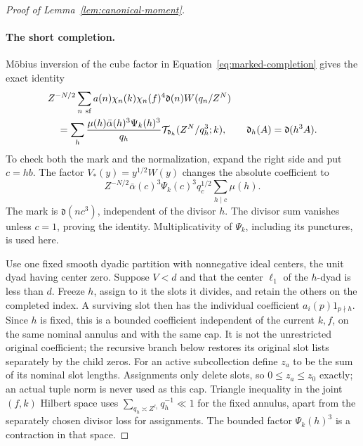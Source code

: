\documentclass[12pt]{article}
\begin{document}
\begin{proof}[Proof of Lemma~\ref{lem:canonical-moment}]
\paragraph{The short completion.}
M\"obius inversion of the cube factor in
Equation~\eqref{eq:marked-completion} gives the exact identity
\begin{equation}\label{eq:marked-completion-inversion}
 \begin{split}
 &Z^{-N/2}\sum_{n\ {\rm sf}}a(n)\chi_n(k)\chi_n(f)^4
       \mathfrak d(n)W(q_n/Z^N)\\
 &\quad=
 \sum_h\frac{\mu(h)\bar\alpha(h)^3\Psi_k(h)^3}{q_h}
       \mathcal T_{\mathfrak d_h}(Z^N/q_h^3;k),
 \qquad \mathfrak d_h(A)=\mathfrak d(h^3A).
 \end{split}
\end{equation}
To check both the mark and the normalization, expand the right side and
put \(c=hb\).  The factor \(V_*(y)=y^{1/2}W(y)\) changes the absolute
coefficient to
\[
 Z^{-N/2}\bar\alpha(c)^3\Psi_k(c)^3q_c^{1/2}
       \sum_{h\mid c}\mu(h).
\]
The mark is \(\mathfrak d(nc^3)\), independent of the divisor \(h\).
The divisor sum vanishes unless \(c=1\), proving the identity.
Multiplicativity of \(\Psi_k\), including its punctures, is used here.

Use one fixed smooth dyadic partition with nonnegative ideal centers,
the unit dyad having center zero.  Suppose \(V<d\) and that the center
\(\ell_1\) of the \(h\)-dyad is less than \(d\).  Freeze \(h\), assign
to it the slots it divides, and retain the others on the completed
index.  A surviving slot then has the individual coefficient
\(a_i(p)1_{p\nmid h}\).  Since \(h\) is fixed, this is a bounded
coefficient independent of the current \(k,f\), on the same nominal
annulus and with the same cap.  It is not the unrestricted original
coefficient; the recursive branch below restores its original slot
lists separately by the child zeros.  For an active subcollection define \(z_a\) to be the sum of its
nominal slot lengths.  Assignments only delete slots, so
\(0\le z_a\le z_0\) exactly; an actual tuple norm is never used as this
cap.  Triangle inequality in the joint \((f,k)\) Hilbert space uses
\(\sum_{q_h\asymp Z^{\ell_1}}q_h^{-1}\ll1\) for the fixed annulus,
apart from the separately chosen divisor loss for assignments.  The
bounded factor \(\Psi_k(h)^3\) is a contraction in that space.


\end{proof}
\end{document}
